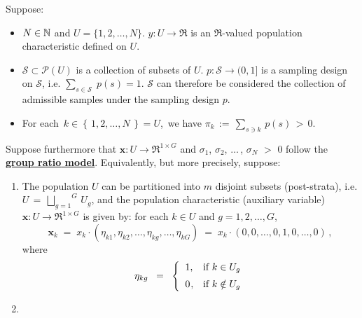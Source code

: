 \begin{proposition}
\mbox{}
\vskip 0.05cm
\noindent
Suppose:
\begin{itemize}
\item
	$N \in \mathbb{N}$ and $U = \{1,2,\ldots,N\}$.
	\vskip 0.05cm
	$y : U \longrightarrow \Re$ is an $\Re$-valued population characteristic defined on $U$.
\item
	$\mathcal{S} \subset \mathcal{P}(U)$ is a collection of subsets of $U$.
	$p : \mathcal{S} \longrightarrow (0,1]$ is a sampling design on $\mathcal{S}$,
	i.e. $\underset{s\in\mathcal{S}}{\sum}\;p(s) = 1$.
	\vskip 0.05cm
	$\mathcal{S}$ can therefore be considered the collection of admissible samples under the sampling design $p$.
\item
	For each \,$k \in \left\{\,1,2,\ldots,N\,\right\} = U$,\, we have
	$\pi_{k} \,:=\, \underset{s \ni k}{\sum}\,p(s) \,>\, 0$.
\end{itemize}
Suppose furthermore that
$\mathbf{x} : U \longrightarrow \Re^{1 \times G}$ and
$\sigma_{1}$, $\sigma_{2}$, $\ldots$\,, $\sigma_{N}$ $>$ $0$
follow the \,\underline{\textbf{{\color{red}group ratio} model}}.
\renewcommand{\theenumi}{\alph{enumi}}
\renewcommand{\labelenumi}{\textnormal{(\theenumi)}$\;\;$}
\vskip 0.1cm
\noindent
Equivalently, but more precisely, suppose:
\begin{enumerate}
\item \vskip -0.25cm
	The population $U$ can be partitioned into $m$ disjoint subsets (post-strata), i.e.
	$U \,=\, \overset{G}{\underset{g=1}{\bigsqcup}}\, U_{g}$, and
	the population characteristic (auxiliary variable)
	$\mathbf{x} : U \longrightarrow \Re^{1 \times G}$ is given by:
	for each $k \in U$ and $g = 1,2,\ldots,G$,
	\begin{equation*}
	\mathbf{x}_{k}
	\; = \; x_{k} \cdot (\eta_{k1},\eta_{k2},\ldots,\eta_{kg},\ldots,\eta_{kG})
	\; = \; x_{k} \cdot (0,0,\ldots,0,1,0,\ldots,0)\,,
	\end{equation*}
	where
	\begin{equation*}
	\eta_{kg}
	\;\; = \;\;
		\left\{\begin{array}{cl}
		1, & \textnormal{if $k \in U_{g}$}
		\\
		\overset{{\color{white}-}}{0}, & \textnormal{if $k \notin U_{g}$}
		\end{array}\right.
	\end{equation*}
\item

\end{enumerate}
\end{proposition}
